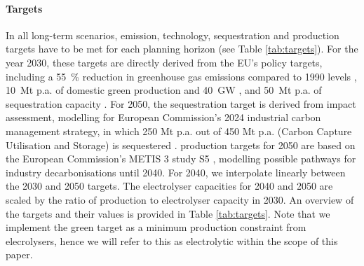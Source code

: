 \documentclass[preprint,12pt,sort&compress]{elsarticle}
\begin{document}
\paragraph{Targets}
\label{sec:targets}
In all long-term scenarios, emission, technology, sequestration and production targets have to be met for each planning horizon (see Table \ref{tab:targets}). For the year 2030, these targets are directly derived from the EU's policy targets, including a \SI{55}{\percent} reduction in greenhouse gas emissions compared to 1990 levels \cite{europeancommissionFit55Delivering2021}, \SI{10}{Mt} p.a. of domestic green  production \cite{europeancommissionREPowerEUPlanCommunication2022} and \SI{40}{GW} \cite{europeancommissionCommunicationCommissionEuropean2020}, and \SI{50}{Mt} p.a. of  sequestration capacity \cite{europeanparliamentRegulationEU20242024}. For 2050, the  sequestration target is derived from impact assessment, modelling for European Commission's 2024 industrial carbon management strategy, in which 250 Mt p.a. out of 450 Mt p.a. (Carbon Capture Utilisation and Storage) is sequestered \cite{europeancommissionCommunicationCommissionEuropean2024}.  production targets for 2050 are based on the European Commission's METIS 3 study S5 \cite{europeancommission.directorategeneralforenergy.METIS3Study2023}, modelling possible pathways for industry decarbonisations until 2040. For 2040, we interpolate linearly between the 2030 and 2050 targets. The electrolyser capacities for 2040 and 2050 are scaled by the ratio of  production to electrolyser capacity in 2030. An overview of the targets and their values is provided in Table \ref{tab:targets}. Note that we implement the green  target as a minimum  production constraint from elecrolysers, hence we will refer to this  as electrolytic  within the scope of this paper.
\end{document}
